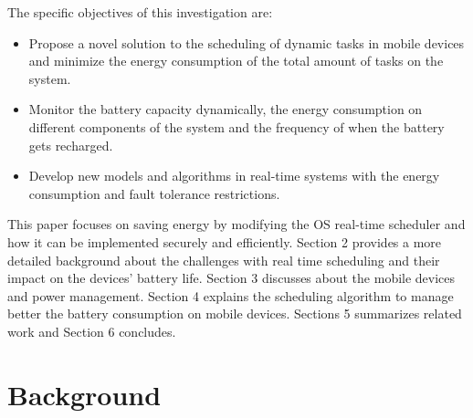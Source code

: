 \documentclass[conference]{IEEEtran}
\begin{document}
The specific objectives of this investigation are:
\begin{itemize}
\item Propose a novel solution to the scheduling of dynamic tasks in mobile devices and minimize the energy consumption of the total amount of tasks on the system.
\item Monitor the battery capacity dynamically, the energy consumption on different components of the system and the frequency of when the battery gets recharged.
\item Develop new models and algorithms in real-time systems with the energy consumption and fault tolerance restrictions.
\end{itemize}


This paper focuses on saving energy by modifying the OS real-time scheduler and how it can be implemented securely and efficiently. 
Section 2 provides a more detailed background about the challenges with real time scheduling and their impact on the devices' battery life. Section 3 discusses about the mobile devices and power management. Section 4 explains the scheduling algorithm to manage better the battery consumption on mobile devices. Sections 5 summarizes related work and Section 6 concludes.



\section{Background}
\end{document}
